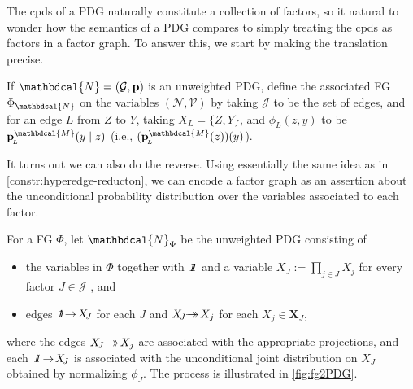 \documentclass[letterpaper]{article} %
\theoremstyle{plain}
\theoremstyle{definition}
\theoremstyle{remark}
\newcommand\mat[1]{\mathbf{#1}}
\newcommand{\tto}{\rightarrow\mathrel{\mspace{-15mu}}\rightarrow}
\newcommand{\bp}[1][L]{\mat{p}_{\!_{#1}\!}}
\newcommand{\V}{\mathcal V}
\newcommand{\N}{\mathcal N}
\newcommand{\dg}[1]{\mathbdcal{#1}}
\newcommand{\pdgunit}{\mathrlap{\mathit 1} \mspace{2.3mu}\mathit 1}
\newcommand{\UPDGof}[1]{{\dg N}_{#1}}
\newcommand{\FGof}[1]{\Phi_{{#1}}}
\newcommand{\Gr}{\mathcal G}
\begin{document}
The cpds of a PDG naturally constitute a collection of factors,
so it natural to wonder how the semantics of a PDG compares to 
simply treating the cpds as factors in a factor graph. To answer this,
we start by making the translation precise.
\begin{defn}\label{def:PDG2fg}
If $\dg N = (\Gr, \mat p)$ is an unweighted PDG, define   
the associated FG $\FGof{\dg N}$ on the 
variables $(\N, \V)$ by
taking $\mathcal J$ to be the set of edges, 
and for an edge $L$ from $Z$ to $Y$, taking $X_{L} = \{Z,Y\}$, and $\phi_L(z,y)$ to be
$\bp^{\dg M}(y \mid z)$ (i.e., $(\bp^{\dg M}(z))(y)$).
\end{defn}


It turns out we can also do the reverse. 
Using essentially the same idea as in \cref{constr:hyperedge-reducton},
we can encode a factor graph as an assertion about the unconditional
probability distribution over the variables associated to each
factor.  

\begin{defn} \label{def:fg2PDG}
For a FG $\Phi$, let $\UPDGof{\Phi}$ be
the unweighted PDG consisting of
\begin{itemize}
	\item the variables in $\Phi$ together
   with $\pdgunit$ and a variable $X_{\!J} := \prod_{j \in J} X_j$ for every factor $J \in \mathcal J$%
   , and
   \item edges ${\pdgunit} \!\!\to\! X_{\!J}$ for each $J$ and $X_{\!J} \!\!\tto\! X_j$ for each $X_j \in \mat X_J$,
\end{itemize}
where the edges $ X_{\!J} \!\tto\! X_j$ are associated with the appropriate projections, and each ${\pdgunit} \!\to\! X_{\!J}$ is associated with the unconditional joint distribution on $X_J$ obtained by normalizing $\phi_J$. 
The process is illustrated in \cref{fig:fg2PDG}.
\end{defn}
\end{document}

